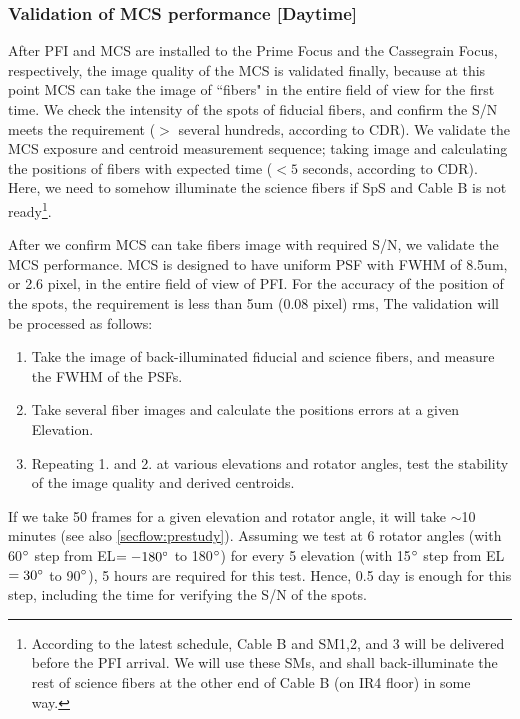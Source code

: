 \subsubsection{Validation of MCS performance [Daytime]}\label{secflow:MCSperf}


After PFI and MCS are installed to the Prime Focus and the Cassegrain  Focus, respectively, the image quality of the MCS is validated finally, because at this point MCS can take the image of ``fibers" in the entire field of view for the first time.
We check the intensity of the spots of fiducial fibers, and confirm the S/N meets the requirement ($>$ several hundreds, according to CDR).
We validate the MCS exposure and centroid measurement sequence; taking image and calculating the positions of fibers with expected time ($<5$ seconds, according to CDR).
Here, we need to somehow illuminate the science fibers if SpS and Cable B is not ready\footnote{According to the latest schedule, Cable B and SM1,2, and 3 will be delivered before the PFI arrival. We will use these SMs, and shall back-illuminate the rest of science fibers at the other end of Cable B (on IR4 floor) in some way.}.

After we confirm MCS can take fibers image with required S/N, we validate the MCS performance.
MCS is designed to have uniform PSF with FWHM of 8.5um, or 2.6 pixel, in the entire field of view of PFI.
For the accuracy of the position of the spots, the requirement is less than 5um (0.08 pixel) rms, 
The validation will be processed as follows:
\begin{enumerate}
\item Take the image of back-illuminated fiducial and science fibers, and measure the FWHM of the PSFs.
\item Take several fiber images and calculate the positions errors at a given Elevation. 
\item Repeating 1. and 2. at various elevations and rotator angles, test the stability of the image quality and derived centroids.
\end{enumerate}

If we take 50 frames for a given elevation and rotator angle, it will take $\sim$10 minutes (see also \ref{secflow:prestudy}).
Assuming we test at 6 rotator angles (with 60$^\circ$ step from EL$=-180^\circ$ to 180$^\circ$) for every 5 elevation (with 15$^\circ$ step from EL$=30^\circ$ to 90$^\circ$), 5 hours are required for this test.
Hence, 0.5 day is enough for this step, including the time for verifying the S/N of the spots.

